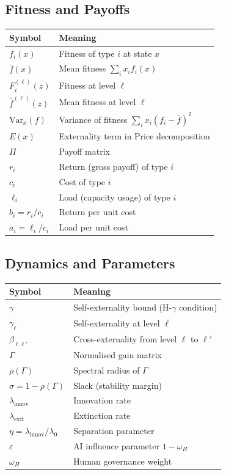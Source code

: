 \documentclass[12pt]{article}
\newcommand{\Var}{\mathrm{Var}}
\begin{document}
\subsection{Fitness and Payoffs}

\begin{tabular}{ll}
\toprule
\textbf{Symbol} & \textbf{Meaning} \\
\midrule
$f_i(x)$ & Fitness of type $i$ at state $x$ \\
$\bar{f}(x)$ & Mean fitness $\sum_i x_i f_i(x)$ \\
$F^{(\ell)}_i(z)$ & Fitness at level $\ell$ \\
$\bar{f}^{(\ell)}(z)$ & Mean fitness at level $\ell$ \\
$\Var_x(f)$ & Variance of fitness $\sum_i x_i (f_i - \bar{f})^2$ \\
$E(x)$ & Externality term in Price decomposition \\
$\Pi$ & Payoff matrix \\
$r_i$ & Return (gross payoff) of type $i$ \\
$c_i$ & Cost of type $i$ \\
$\ell_i$ & Load (capacity usage) of type $i$ \\
$b_i = r_i / c_i$ & Return per unit cost \\
$a_i = \ell_i / c_i$ & Load per unit cost \\
\bottomrule
\end{tabular}

\subsection{Dynamics and Parameters}

\begin{tabular}{ll}
\toprule
\textbf{Symbol} & \textbf{Meaning} \\
\midrule
$\gamma$ & Self-externality bound (H-$\gamma$ condition) \\
$\gamma_\ell$ & Self-externality at level $\ell$ \\
$\beta_{\ell\ell'}$ & Cross-externality from level $\ell$ to $\ell'$ \\
$\Gamma$ & Normalised gain matrix \\
$\rho(\Gamma)$ & Spectral radius of $\Gamma$ \\
$\sigma = 1 - \rho(\Gamma)$ & Slack (stability margin) \\
$\lambda_{\text{innov}}$ & Innovation rate \\
$\lambda_{\text{exit}}$ & Extinction rate \\
$\eta = \lambda_{\text{innov}} / \lambda_0$ & Separation parameter \\
$\varepsilon$ & AI influence parameter $1 - \omega_H$ \\
$\omega_H$ & Human governance weight \\
\bottomrule
\end{tabular}
\end{document}
